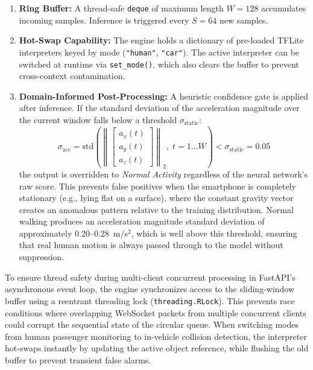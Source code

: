 \documentclass[journal]{IEEEtran}
\begin{document}
\begin{enumerate}
  \item \textbf{Ring Buffer:} A thread-safe \texttt{deque} of maximum length
        $W = 128$ accumulates incoming samples. Inference is triggered every
        $S = 64$ new samples.

  \item \textbf{Hot-Swap Capability:} The engine holds a dictionary of
        pre-loaded TFLite interpreters keyed by mode
        (\texttt{"human"}, \texttt{"car"}). The active interpreter can be
        switched at runtime via \texttt{set\_mode()}, which also clears the
        buffer to prevent cross-context contamination.

  \item \textbf{Domain-Informed Post-Processing:} A heuristic confidence gate
        is applied after inference. If the standard deviation of the
        acceleration magnitude over the current window falls below a threshold
        $\sigma_{\text{static}}$:
        \begin{equation}
          \sigma_{\text{acc}} = \text{std}\!\left( \left\|
            \begin{bmatrix} a_x(t) \\ a_y(t) \\ a_z(t) \end{bmatrix}
          \right\|_2, \; t = 1 \ldots W \right) < \sigma_{\text{static}} = 0.05
          \label{eq:guardrail}
        \end{equation}
        the output is overridden to \textit{Normal Activity} regardless of the
        neural network's raw score. This prevents false positives when the
        smartphone is completely stationary (e.g., lying flat on a surface),
        where the constant gravity vector creates an anomalous pattern relative
        to the training distribution. Normal walking produces an acceleration
        magnitude standard deviation of approximately 0.20--0.28~m/s$^2$,
        which is well above this threshold, ensuring that real human motion
        is always passed through to the model without suppression.
\end{enumerate}

To ensure thread safety during multi-client concurrent processing in FastAPI's asynchronous event loop, the engine synchronizes access to the sliding-window buffer using a reentrant threading lock (\texttt{threading.RLock}). This prevents race conditions where overlapping WebSocket packets from multiple concurrent clients could corrupt the sequential state of the circular queue. When switching modes from human passenger monitoring to in-vehicle collision detection, the interpreter hot-swaps instantly by updating the active object reference, while flushing the old buffer to prevent transient false alarms.
\end{document}
